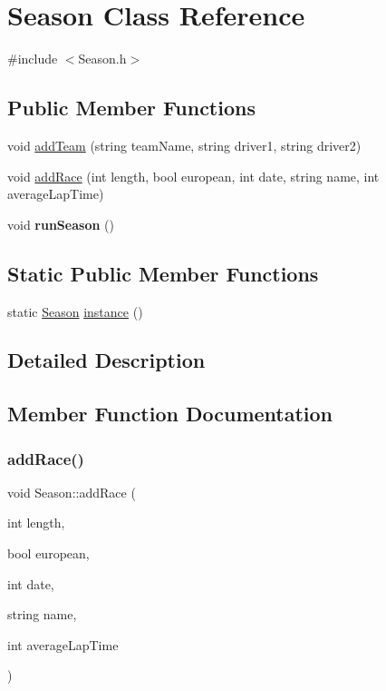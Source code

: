 \hypertarget{classSeason}{}\section{Season Class Reference}
\label{classSeason}


{\ttfamily \#include $<$Season.\+h$>$}

\subsection*{Public Member Functions}
\begin{DoxyCompactItemize}
\item 
void \hyperlink{classSeason_a46121f481fc764fa9e480708817442aa}{add\+Team} (string team\+Name, string driver1, string driver2)
\item 
void \hyperlink{classSeason_a6b4c865c1da9ad6ae00b1ce081aed292}{add\+Race} (int length, bool european, int date, string name, int average\+Lap\+Time)
\item 
\mbox{\label{classSeason_ac87bc08315fcfb5a5921e476ff608934}} 
void {\bfseries run\+Season} ()
\end{DoxyCompactItemize}
\subsection*{Static Public Member Functions}
\begin{DoxyCompactItemize}
\item 
static \hyperlink{classSeason}{Season} \hyperlink{classSeason_a6f0fa8d25bd43abc987a25e6f6936fd7}{instance} ()
\end{DoxyCompactItemize}


\subsection{Detailed Description}


\subsection{Member Function Documentation}
\mbox{\label{classSeason_a6b4c865c1da9ad6ae00b1ce081aed292}} 
\subsubsection{\texorpdfstring{add\+Race()}{addRace()}}
{\footnotesize\ttfamily void Season\+::add\+Race (\begin{DoxyParamCaption}\item[{int}]{length,  }\item[{bool}]{european,  }\item[{int}]{date,  }\item[{string}]{name,  }\item[{int}]{average\+Lap\+Time }\end{DoxyParamCaption})}


